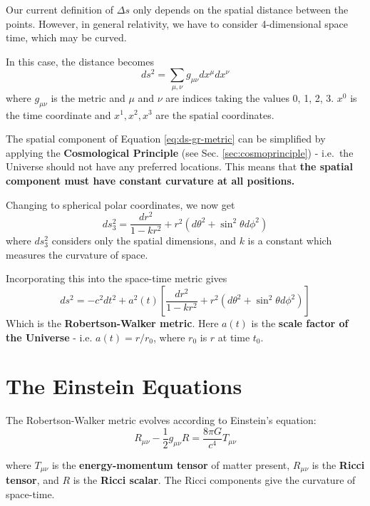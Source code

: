 \documentclass[]{book}
\begin{document}
Our current definition of \(\Delta s\) only depends on the spatial
distance between the points. However, in general relativity, we have to
consider 4-dimensional space time, which may be curved.

In this case, the distance becomes
\begin{equation}
ds^2 = \sum_{\mu, \nu} g_{\mu\nu} dx^{\mu} dx^{\nu}
\label{eq:ds-gr-metric}
\end{equation}
where \(g_{\mu\nu}\) is the metric and \(\mu\) and \(\nu\) are indices taking
the values 0, 1, 2, 3. \(x^{0}\) is the time coordinate and
\(x^{1}, x^{2}, x^{3}\) are the spatial coordinates.

The spatial component of
Equation \eqref{eq:ds-gr-metric} can be simplified by applying the
\textbf{Cosmological Principle} (see Sec. \ref{sec:cosmoprinciple}) - i.e.~the Universe should not have any
preferred locations. This means that \textbf{the spatial component must have
constant curvature at all positions.}

Changing to spherical polar coordinates, we now get
\begin{equation}
ds^2_3 = \dfrac{dr^2}{1 - kr^2} + r^2\left(d\theta^2 + \sin^2\theta d\phi^2\right)
\label{eq:ds-gr-metric-polar}
\end{equation}
where \(ds_3^2\) considers only the spatial dimensions, and \(k\) is a
constant which measures the curvature of space.

Incorporating this into the space-time metric gives
\begin{equation}
ds^2 = -c^2 dt^2 + a^2(t) \left[\dfrac{dr^2}{1 - kr^2} + r^2\left(d\theta^2 + \sin^2\theta d\phi^2\right)\right]
\label{eq:rw-metric}
\end{equation}
Which is the \textbf{Robertson-Walker metric}. Here \(a(t)\) is the \textbf{scale
factor of the Universe} - i.e. \(a(t) = r/r_0\), where \(r_0\) is \(r\) at
time \(t_0\).

\hypertarget{sec:einstein_eqs}{%
\section{The Einstein Equations}\label{sec:einstein_eqs}}

The Robertson-Walker metric evolves according to Einstein's equation:
\begin{equation}
R_{\mu\nu} - \dfrac{1}{2}g_{\mu\nu}R = \dfrac{8\pi G}{c^4} T_{\mu\nu}
\label{eq:einstein}
\end{equation}

where \({T_{\mu\nu}}\) is the \textbf{energy-momentum tensor} of matter
present, \({R_{\mu\nu}}\) is the \textbf{Ricci tensor}, and \({R}\)
is the \textbf{Ricci scalar}. The Ricci components give the curvature of
space-time.
\end{document}
